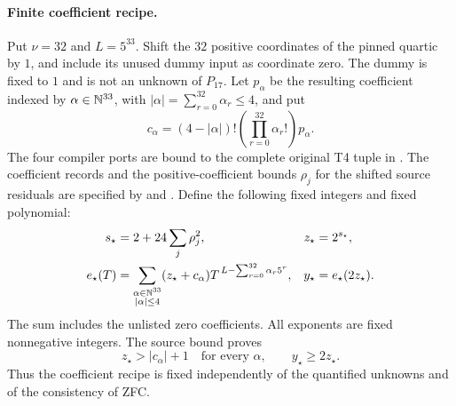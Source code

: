 \paragraph{Finite coefficient recipe.}
Put $\nu=32$ and $L=5^{33}$. Shift the $32$ positive coordinates of the
pinned quartic by $1$, and include its unused dummy input as coordinate
zero. The dummy is fixed to $1$ and is not an unknown of $P_{17}$.
Let $p_\alpha$ be the resulting coefficient indexed by
$\alpha\in\mathbb N^{33}$, with
$|\alpha|=\sum_{r=0}^{32}\alpha_r\le4$, and put
\[
 c_\alpha=(4-|\alpha|)!\left(\prod_{r=0}^{32}\alpha_r!\right)p_\alpha.
\]
The four compiler ports are bound to the complete original T4 tuple in
.
The coefficient records and the positive-coefficient bounds $\rho_j$ for
the shifted source residuals are specified by
 and
.
Define the following fixed integers and fixed polynomial:
\begin{align*}
 s_\star&=2+24\sum_j\rho_j^2,
 &z_\star&=2^{s_\star},\\
 e_\star(T)&=
 \sum_{\substack{\alpha\in\mathbb N^{33}\\|\alpha|\le4}}
 (z_\star+c_\alpha)T^{\,L-\sum_{r=0}^{32}\alpha_r5^r},
 &y_\star&=e_\star(2z_\star).
\end{align*}
The sum includes the unlisted zero coefficients. All exponents are fixed
nonnegative integers. The source bound proves
\[
 z_\star>|c_\alpha|+1\quad\text{for every }\alpha,
 \qquad y_\star\ge2z_\star.
\]
Thus the coefficient recipe is fixed independently of the quantified
unknowns and of the consistency of ZFC.

